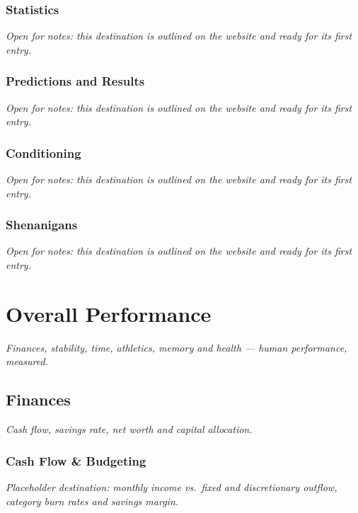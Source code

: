 \documentclass{article}
\begin{document}
\subsubsection{Statistics}\label{sec:statistics}
\textit{Open for notes: this destination is outlined on the website and ready for its first entry.}

\subsubsection{Predictions and Results}\label{sec:predictions-and-results}
\textit{Open for notes: this destination is outlined on the website and ready for its first entry.}

\subsubsection{Conditioning}\label{sec:conditioning}
\textit{Open for notes: this destination is outlined on the website and ready for its first entry.}

\subsubsection{Shenanigans}\label{sec:sports-analytics-shenanigans}
\textit{Open for notes: this destination is outlined on the website and ready for its first entry.}

\section{Overall Performance}\label{sec:overall-performance}
\textit{Finances, stability, time, athletics, memory and health --- human performance, measured.}

\subsection{Finances}\label{sec:finances}
\textit{Cash flow, savings rate, net worth and capital allocation.}

\subsubsection{Cash Flow \& Budgeting}\label{sec:cash-flow-and-budgeting}
\textit{Placeholder destination: monthly income vs.\ fixed and discretionary outflow, category burn rates and savings margin.}
\end{document}
